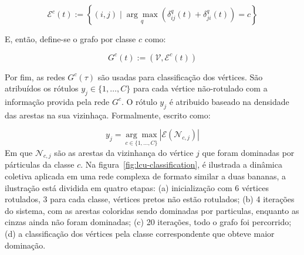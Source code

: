 \begin{equation}\label{eq:lcu-edges-by-class}
  \mathcal{E}^c(t):=\left\{(i, j) \mid \underset{q}{\arg \max }\left(\delta_{i j}^q(t)+\delta_{j i}^q(t)\right)=c\right\}
\end{equation}

E, então, define-se o grafo por classe $c$ como:

\begin{equation}\label{eq:lcu-subnetworks}
  G^c(t):=\left(\mathcal{V}, \mathcal{E}^c(t)\right)
\end{equation}

Por fim, as redes $ G^c(\tau) $ são usadas para classificação dos
vértices. São atribuídos os rótulos $y_j \in \{1, \ldots, C\}$ para cada
vértice não-rotulado com a informação provida pela rede $G^c$.  O
rótulo $y_j$ é atribuido baseado na densidade das arestas na sua
vizinhaça. Formalmente, escrito como:

\begin{equation}\label{eq:lcu-vertex-classification}
y_j = \underset{c \in \{1, \ldots, C\}}{\arg \max }\left| \mathcal{E}(\mathcal{N}_{c,j}) \right|
\end{equation}
\noindent
Em que ${\mathcal{N}_{c,j}}$ são as arestas da vizinhança do vértice $j$ que
foram dominadas por párticulas da classe $c$. Na
figura~\ref{fig:lcu-classification}, é ilustrada a dinâmica coletiva
aplicada em uma rede complexa de formato similar a duas bananas, a
ilustração está dividida em quatro etapas: (a) inicialização com 6
vértices rotulados, 3 para cada classe, vértices pretos não estão
rotulados; (b) 4 iterações do sistema, com as arestas coloridas
sendo dominadas por particulas, enquanto as cinzas ainda não foram
dominadas; (c) 20 iterações, todo o grafo foi percorrido; (d) a
classificação dos vértices pela classe correspondente que obteve maior
dominação.

\begin{figure}[h!]
        \captionsetup{width=12cm}
		\centering
\end{figure}

